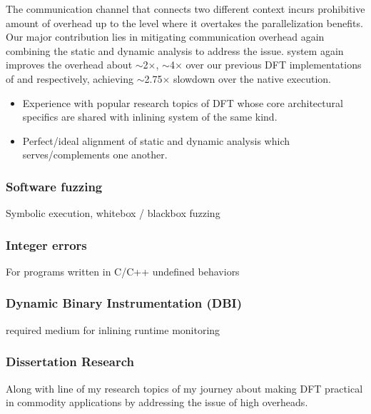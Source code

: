 \documentclass[letterpaper, 10pt]{article}
\begin{document}
\begin{small}
The communication channel that connects two different context incurs
prohibitive amount of overhead up to the level where it overtakes the
parallelization benefits. Our major contribution lies in mitigating
communication overhead again combining the static and dynamic analysis to
address the issue.
%
\SR system again improves the overhead about $\sim$2$\times$, $\sim$4$\times$
over our previous DFT implementations of \TFA and \libdft respectively,
achieving $\sim$2.75$\times$ slowdown over the native execution. 

\begin{itemize}
    \item Experience with popular research topics of DFT whose core
    architectural specifics are shared with inlining system of the same
    kind. 
    \item Perfect/ideal alignment of static and dynamic analysis which
    serves/complements one another.  
\end{itemize}


\subsubsection*{Software fuzzing}
Symbolic execution, whitebox / blackbox fuzzing

\subsubsection*{Integer errors}
For programs written in C/C++ undefined behaviors

\subsubsection*{Dynamic Binary Instrumentation (DBI)}
required medium for inlining runtime monitoring 

\subsubsection*{Dissertation Research}
Along with line of my research topics of my journey about making DFT practical
in commodity applications by addressing the issue of high overheads.



\end{small}
\end{document}
